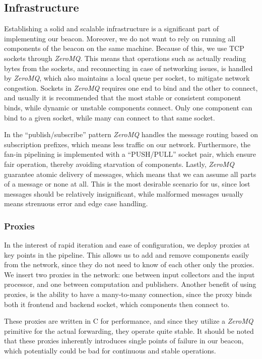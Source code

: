 \subsection{Infrastructure}%
\label{sub:infrastructure}
Establishing a solid and scalable infrastructure is a significant part of implementing our beacon.
Moreover, we do not want to rely on running all components of the beacon on the same machine.
Because of this, we use TCP sockets through \textit{ZeroMQ}.
This means that operations such as actually reading bytes from the sockets, and reconnecting in case of networking issues, is handled by \textit{ZeroMQ}, which also maintains a local queue per socket, to mitigate network congestion.
Sockets in \textit{ZeroMQ} requires one end to bind and the other to connect, and usually it is recommended that the most stable or consistent component binds, while dynamic or unstable components connect.
Only one component can bind to a given socket, while many can connect to that same socket.

In the \enquote{publish/subscribe} pattern \textit{ZeroMQ} handles the message routing based on subscription prefixes, which means less traffic on our network.
Furthermore, the fan-in pipelining is implemented with a \enquote{PUSH/PULL} socket pair, which ensure fair operation, thereby avoiding starvation of components.
Lastly, \textit{ZeroMQ} guarantee atomic delivery of messages, which means that we can assume all parts of a message or none at all.
This is the most desirable scenario for us, since lost messages should be relatively insignificant, while malformed messages usually means strenuous error and edge case handling.

\subsubsection{Proxies}
In the interest of rapid iteration and ease of configuration, we deploy proxies at key points in the pipeline.
This allows us to add and remove components easily from the network, since they do not need to know of each other only the proxies.
We insert two proxies in the network: one between input collectors and the input processor, and one between computation and publishers.
Another benefit of using proxies, is the ability to have a many-to-many connection, since the proxy binds both it frontend and backend socket, which components then connect to.

These proxies are written in C for performance, and since they utilize a \textit{ZeroMQ} primitive for the actual forwarding, they operate quite stable.
It should be noted that these proxies inherently introduces single points of failure in our beacon, which potentially could be bad for continuous and stable operations.

